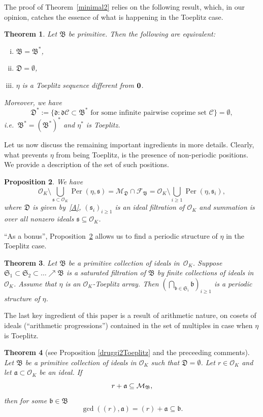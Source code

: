 \documentclass[leqno,a4paper,12pt]{article}
\newtheorem{Thx}{Theorem}
\newtheorem{Propx}[Thx]{Proposition}
\theoremstyle{definition}
\newcommand{\Per}{\operatorname{Per}\nolimits}
\newcommand{\cm}{{\cal M}}
\newcommand{\OK}{\mathcal{O}_K}
\newcommand{\cC}{\mathcal{C}}
\begin{document}
The proof of Theorem~\ref{minimal2} relies on the following result, which, in our opinion, catches the essence of what is happening in the Toeplitz case.
\begin{Thx}\label{dwyz}
Let $\mathfrak{B}$ be primitive. Then the following are equivalent:
\begin{enumerate}[(i)]
\item $\mathfrak{B}=\mathfrak{B}^*$,
\item $\mathfrak{D}=\emptyset$,
\item $\eta$ is a Toeplitz sequence different from $\bf{0}$.
\end{enumerate}
Moreover, we have
\[
\mathfrak{D}^*:=\{\mathfrak{d} :  \mathfrak{d}\cC\subset\mathfrak{B}^* \text{ for some infinite pairwise coprime set }\cC\}=\emptyset,
\]
i.e.\ $\mathfrak{B}^*=(\mathfrak{B}^*)^*$ and $\eta^*$ is Toeplitz.
\end{Thx}

Let us now discuss the remaining important ingredients in more details.
Clearly, what prevents $\eta$ from being Toeplitz, is the presence of non-periodic positions. We provide a description of the set of such positions.
\begin{Propx}\label{propA}
We have
\begin{equation}\label{teza}
\OK\setminus \bigcup_{\mathfrak{s}\subset \OK}\Per(\eta,\mathfrak{s})=\mathcal{M}_{\mathfrak{D}}\cap \mathcal{F}_{\mathfrak{B}}=\OK\setminus\bigcup_{i\geq1}\Per(\eta,\mathfrak{s}_i),
\end{equation}
where $\mathfrak{D}$ is given by~\eqref{A}, $(\mathfrak{s}_i)_{i\ge 1}$ is an ideal  filtration of $\OK$ and summation is over all nonzero ideals $\mathfrak{s}\subseteq \OK$.
\end{Propx}
``As a bonus'', Proposition~\ref{propA} allows us to find a periodic structure of $\eta$ in the Toeplitz case.
\begin{Thx}\label{thxC}
Let $\mathfrak{B}$ be a primitive collection of ideals in~$\OK$. Suppose $\mathfrak{S}_1\subset \mathfrak{S}_2\subset\dots\nearrow\mathfrak{B}$ is a saturated filtration of $\mathfrak{B}$ by finite collections of ideals in $\OK$. Assume that $\eta$ is an $\OK$-Toeplitz array. Then $(\bigcap_{\mathfrak{b}\in\mathfrak{S}_i}\mathfrak{b})_{i\geq1}$ is a periodic structure of $\eta$.
\end{Thx}

The last key ingredient of this paper is a result of arithmetic nature, on cosets of ideals (``arithmetic progressions'') contained in the set of multiples  in case when $\eta$ is Toeplitz.
\begin{Thx}[see Proposition \ref{druggi2Toeplitz} and the preceeding comments]\label{Thm_SK}
Let $\mathfrak{B}$ be a primitive collection of ideals in $\OK$ such that $\mathfrak{D}=\emptyset$. Let $r\in\OK$ and  let $\mathfrak{a}\subset\OK$ be an ideal. If
\[
r+\mathfrak{a}\subseteq\cm_\mathfrak{B},
\]
then for some $\mathfrak{b}\in\mathfrak{B}$
\[
\gcd((r),\mathfrak{a})=(r)+\mathfrak{a}\subseteq\mathfrak{b}.
\]
\end{Thx}
\end{document}
